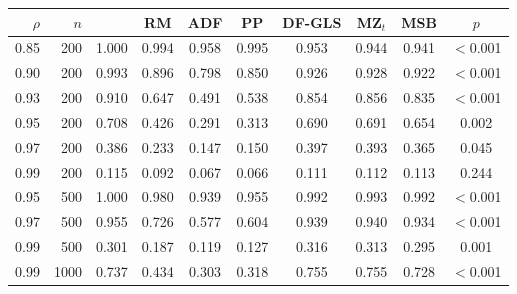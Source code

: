 \begin{tabular}{rrcccccccc}
\toprule
$\rho$ & $n$ & \RMGLS{} & RM & ADF & PP & DF-GLS & MZ$_t$ & MSB & $p$ \\
\midrule
0.85 & 200 & 1.000 & 0.994 & 0.958 & 0.995 & 0.953 & 0.944 & 0.941 & $<$0.001 \\
0.90 & 200 & 0.993 & 0.896 & 0.798 & 0.850 & 0.926 & 0.928 & 0.922 & $<$0.001 \\
0.93 & 200 & 0.910 & 0.647 & 0.491 & 0.538 & 0.854 & 0.856 & 0.835 & $<$0.001 \\
0.95 & 200 & 0.708 & 0.426 & 0.291 & 0.313 & 0.690 & 0.691 & 0.654 & 0.002 \\
0.97 & 200 & 0.386 & 0.233 & 0.147 & 0.150 & 0.397 & 0.393 & 0.365 & 0.045 \\
0.99 & 200 & 0.115 & 0.092 & 0.067 & 0.066 & 0.111 & 0.112 & 0.113 & 0.244 \\
0.95 & 500 & 1.000 & 0.980 & 0.939 & 0.955 & 0.992 & 0.993 & 0.992 & $<$0.001 \\
0.97 & 500 & 0.955 & 0.726 & 0.577 & 0.604 & 0.939 & 0.940 & 0.934 & $<$0.001 \\
0.99 & 500 & 0.301 & 0.187 & 0.119 & 0.127 & 0.316 & 0.313 & 0.295 & 0.001 \\
0.99 & 1000 & 0.737 & 0.434 & 0.303 & 0.318 & 0.755 & 0.755 & 0.728 & $<$0.001 \\
\bottomrule
\end{tabular}

